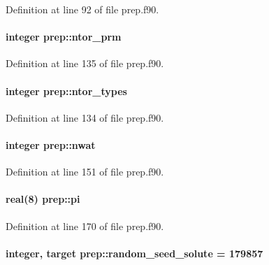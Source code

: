 Definition at line 92 of file prep.\-f90.

\hypertarget{classprep_abf46f8b225b713c8e1eff53bcecdee8c}{
\paragraph[{ntor\-\_\-prm}]{\setlength{\rightskip}{0pt plus 5cm}integer prep\-::ntor\-\_\-prm}}\label{classprep_abf46f8b225b713c8e1eff53bcecdee8c}


Definition at line 135 of file prep.\-f90.

\hypertarget{classprep_a1db4f2bef544894cece6f2a4f6df3d15}{
\paragraph[{ntor\-\_\-types}]{\setlength{\rightskip}{0pt plus 5cm}integer prep\-::ntor\-\_\-types}}\label{classprep_a1db4f2bef544894cece6f2a4f6df3d15}


Definition at line 134 of file prep.\-f90.

\hypertarget{classprep_a29b7c355a8f655a65d6589479f27f0f1}{
\paragraph[{nwat}]{\setlength{\rightskip}{0pt plus 5cm}integer prep\-::nwat}}\label{classprep_a29b7c355a8f655a65d6589479f27f0f1}


Definition at line 151 of file prep.\-f90.

\hypertarget{classprep_a1e865a41955c21ed803962409e39acf9}{
\paragraph[{pi}]{\setlength{\rightskip}{0pt plus 5cm}real(8) prep\-::pi}}\label{classprep_a1e865a41955c21ed803962409e39acf9}


Definition at line 170 of file prep.\-f90.

\hypertarget{classprep_a4e1a07eb57a103152818e73c1a23e65c}{
\paragraph[{random\-\_\-seed\-\_\-solute}]{\setlength{\rightskip}{0pt plus 5cm}integer, target prep\-::random\-\_\-seed\-\_\-solute = 179857}}\label{classprep_a4e1a07eb57a103152818e73c1a23e65c}



